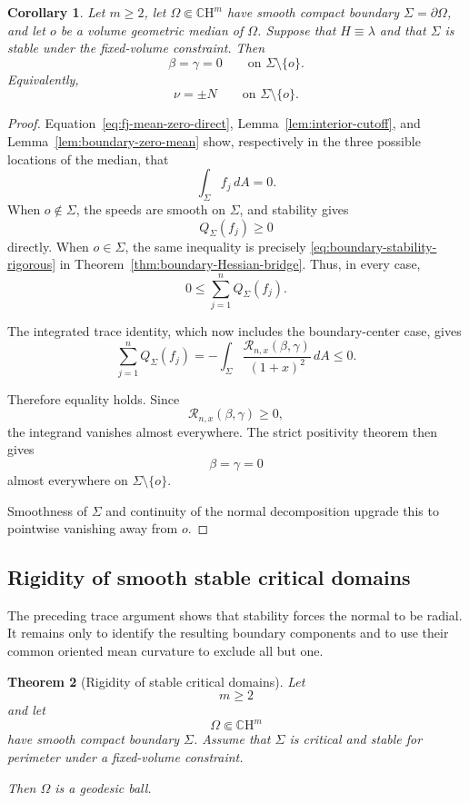 \documentclass[11pt,reqno]{amsart}
\numberwithin{equation}{section}
\newtheorem{theorem}{Theorem}[section]
\newtheorem{corollary}[theorem]{Corollary}
\theoremstyle{definition}
\theoremstyle{remark}
\newcommand{\CH}{\mathbb{C}\mathrm{H}}
\begin{document}
\begin{corollary}
\label{cor:stability-radial-normal}
Let \(m\ge2\), let \(\Omega\Subset\CH^m\) have smooth compact boundary
\(\Sigma=\partial\Omega\), and let \(o\) be a volume geometric median of
\(\Omega\).
Suppose that \(H\equiv\lambda\) and that \(\Sigma\) is stable under the
fixed-volume constraint. Then
\[
\beta=\gamma=0
\qquad
\text{on }\Sigma\setminus\{o\}.
\]
Equivalently,
\[
\nu=\pm N
\qquad
\text{on }\Sigma\setminus\{o\}.
\]
\end{corollary}

\begin{proof}
Equation~\eqref{eq:fj-mean-zero-direct},
Lemma~\ref{lem:interior-cutoff}, and
Lemma~\ref{lem:boundary-zero-mean} show, respectively in the three possible
locations of the median, that
\[
\int_\Sigma f_j\,dA=0.
\]
When \(o\notin\Sigma\), the speeds are smooth on \(\Sigma\), and stability
gives
\[
Q_\Sigma(f_j)\ge0
\]
directly. When \(o\in\Sigma\), the same inequality is precisely
\eqref{eq:boundary-stability-rigorous} in
Theorem~\ref{thm:boundary-Hessian-bridge}. Thus, in every case,
\[
0
\le
\sum_{j=1}^nQ_\Sigma(f_j).
\]

The integrated trace identity, which now includes the
boundary-center case, gives
\[
\sum_{j=1}^nQ_\Sigma(f_j)
=
-
\int_\Sigma
\frac{
\mathcal R_{n,x}(\beta,\gamma)
}{
(1+x)^2
}\,dA
\le0.
\]

Therefore equality holds. Since
\[
\mathcal R_{n,x}(\beta,\gamma)\ge0,
\]
the integrand vanishes almost everywhere. The strict positivity theorem
then gives
\[
\beta=\gamma=0
\]
almost everywhere on \(\Sigma\setminus\{o\}\).

Smoothness of \(\Sigma\) and continuity of the normal decomposition upgrade
this to pointwise vanishing away from \(o\).
\end{proof}

\subsection{Rigidity of smooth stable critical domains}

The preceding trace argument shows that stability forces the normal to be
radial.  It remains only to identify the resulting boundary components and
to use their common oriented mean curvature to exclude all but one.

\begin{theorem}[Rigidity of stable critical domains]
\label{thm:smooth-rigidity}
Let
\[
m\ge2
\]
and let
\[
\Omega\Subset\CH^m
\]
have smooth compact boundary \(\Sigma\). Assume that \(\Sigma\) is critical
and stable for perimeter under a fixed-volume constraint.

Then \(\Omega\) is a geodesic ball.
\end{theorem}
\end{document}
